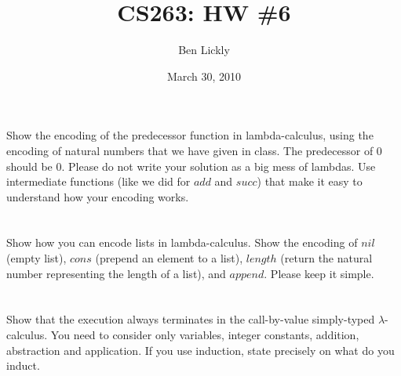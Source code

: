 \documentclass{article}
\title{CS263: HW \#6}
\author{Ben Lickly}
\date{March 30, 2010}
\newcommand{\problem}[1]
{\subsubsection*{} %
\vspace{-16pt} \section{} \vspace{-22pt} \qquad
#1%
\bigskip \bigskip
}
\begin{document}
\maketitle

\problem{Show the encoding of the predecessor function in lambda-calculus, using
the encoding of natural numbers that we have given in class. The predecessor of 0
should be 0. Please do not write your solution as a big mess of lambdas. Use
intermediate functions (like we did for $add$ and $succ$) that make it easy to
understand how your encoding works.
}

\problem{Show how you can encode lists in lambda-calculus. Show the encoding of
$nil$ (empty list), $cons$ (prepend an element to a list), $length$ (return the
natural number representing the length of a list), and $append$. Please keep it
simple.
}

\problem{Show that the execution always terminates in the call-by-value
simply-typed $\lambda$-calculus. You need to consider only variables, integer
constants, addition, abstraction and application. If you use induction, state
precisely on what do you induct.
}
\end{document}
